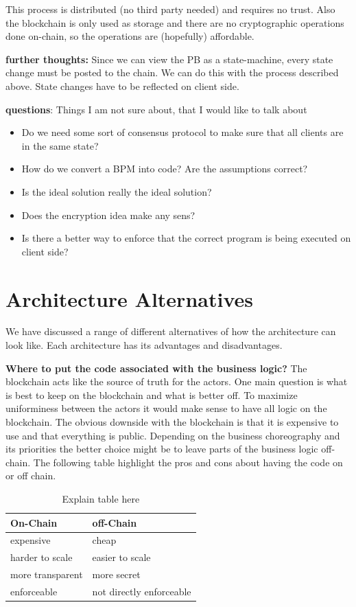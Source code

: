 \documentclass[runningheads]{llncs}
\begin{document}
{This process is distributed (no third party needed) and requires no trust. Also the blockchain is only used as storage and there are no cryptographic operations done on-chain, so the operations are (hopefully) affordable.

\textbf{further thoughts:} Since we can view the PB as a state-machine, every state change must be posted to the chain. We can do this with the process described above. State changes have to be reflected on client side. 

\textbf{questions}: Things I am not sure about, that I would like to talk about
\begin{itemize}
    \item Do we need some sort of consensus protocol to make sure that all clients are in the same state?
    \item How do we convert a BPM into code? Are the assumptions correct?
    \item  Is the ideal solution really the ideal solution? 
    \item Does the encryption idea make any sens?
    \item Is there a better way to enforce that the correct program is being executed on client side?
\end{itemize}
}


\section{Architecture Alternatives}
We have discussed a range of different alternatives of how the architecture can look like. Each architecture has its advantages and disadvantages.

\textbf{Where to put the code associated with the business logic?}
The blockchain acts like the source of truth for the actors. One main question is what is best to keep on the blockchain and what is better off. To maximize uniforminess between the actors it would make sense to have all logic on the blockchain. The obvious downside with the blockchain is that it is expensive to use and that everything is public. Depending on the business choreography and its priorities the better choice might be to leave parts of the business logic off-chain. The following table highlight the pros and cons about having the code on or off chain.

\begin{table}[t]
  \centering
  \begin{tabular}{p{6cm}p{6cm}}
  \hline
    \textbf{On-Chain} & \textbf{off-Chain}\\
    \hline \hline
    
 expensive & cheap \\
     harder to scale & easier to scale \\
     more transparent & more secret \\
     enforceable & not directly enforceable \\

\hline
  \end{tabular}
  \caption{Explain table here}
  \label{tab:1}
\end{table}
\end{document}
